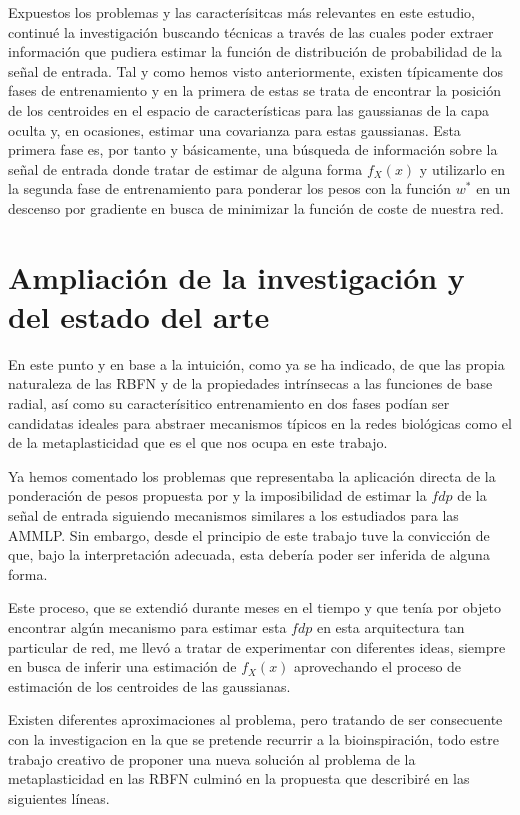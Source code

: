 \documentclass[10pt,a4paper]{report}
\begin{document}
Expuestos los problemas y las caracterísitcas más relevantes en este estudio, continué la investigación buscando técnicas a través de las cuales poder extraer información que pudiera estimar la función de distribución de probabilidad de la señal de entrada. Tal y como hemos visto anteriormente, existen típicamente dos fases de entrenamiento y en la primera de estas se trata de encontrar la posición de los centroides en el espacio de características para las gaussianas de la capa oculta y, en ocasiones, estimar una covarianza para estas gaussianas. Esta primera fase es, por tanto y básicamente, una búsqueda de información sobre la señal de entrada donde tratar de estimar de alguna forma $f_X(x)$ y utilizarlo en la segunda fase de entrenamiento para ponderar los pesos con la función $w^*$ en un descenso por gradiente en busca de minimizar la función de coste de nuestra red.

\section{Ampliación de la investigación y del estado del arte}
En este punto y en base a la intuición, como ya se ha indicado, de que las propia naturaleza de las RBFN y de la propiedades intrínsecas a las funciones de base radial, así como su caracterísitico entrenamiento en dos fases podían ser candidatas ideales para abstraer mecanismos típicos en la redes biológicas como el de la metaplasticidad que es el que nos ocupa en este trabajo.

Ya hemos comentado los problemas que representaba la aplicación directa de la ponderación de pesos propuesta por \citep{Andina2009} y la imposibilidad de estimar la $fdp$ de la señal de entrada siguiendo mecanismos similares a los estudiados para las AMMLP. Sin embargo, desde el principio de este trabajo tuve la convicción de que, bajo la interpretación adecuada, esta debería poder ser inferida de alguna forma.

Este proceso, que se extendió durante meses en el tiempo y que tenía por objeto encontrar algún mecanismo para estimar esta $fdp$ en esta arquitectura tan particular de red, me llevó a tratar de experimentar con diferentes ideas, siempre en busca de inferir una estimación de $f_X(x)$ aprovechando el proceso de estimación de los centroides de las gaussianas.

Existen diferentes aproximaciones al problema, pero tratando de ser consecuente con la investigacion en la que se pretende recurrir a la bioinspiración, todo estre trabajo creativo de proponer una nueva solución al problema de la metaplasticidad en las RBFN culminó en la propuesta que describiré en las siguientes líneas.
\end{document}
